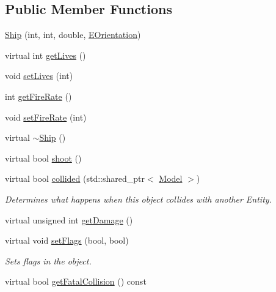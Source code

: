 \subsection*{\-Public \-Member \-Functions}
\begin{DoxyCompactItemize}
\item 
\hyperlink{classmodels_1_1Ship_a5138678b499d6d15c4b7ebef7e6d01d5}{\-Ship} (int, int, double, \hyperlink{namespacemodels_adec64ede5178a8b8fed882b3790d423d}{\-E\-Orientation})
\item 
virtual int \hyperlink{classmodels_1_1Ship_af26c5ca97e37197f48ea983a668035f6}{get\-Lives} ()
\item 
void \hyperlink{classmodels_1_1Ship_a79a5082391e2107638d45a51ce9770c2}{set\-Lives} (int)
\item 
int \hyperlink{classmodels_1_1Ship_a72f0be3703de59176bf176a7a06fcd39}{get\-Fire\-Rate} ()
\item 
void \hyperlink{classmodels_1_1Ship_aa06aba3051126d29e6e942eec54b350d}{set\-Fire\-Rate} (int)
\item 
virtual \hyperlink{classmodels_1_1Ship_aa193577f5d3e0ff3ca6e3223090d3e71}{$\sim$\-Ship} ()
\item 
virtual bool \hyperlink{classmodels_1_1Ship_afc4a82da0df7e98ba74ca068946358f5}{shoot} ()
\item 
virtual bool \hyperlink{classmodels_1_1Ship_aaa5808c580620f89bb0a04d3583a112e}{collided} (std\-::shared\-\_\-ptr$<$ \hyperlink{classmodels_1_1Model}{\-Model} $>$)
\begin{DoxyCompactList}\small\item\em \-Determines what happens when this object collides with another \-Entity. \end{DoxyCompactList}\item 
virtual unsigned int \hyperlink{classmodels_1_1Ship_acf8c86d8f95c22f990c37628ed40491e}{get\-Damage} ()
\item 
virtual void \hyperlink{classmodels_1_1Ship_a75c0e291076162e3efb9679c5896d515}{set\-Flags} (bool, bool)
\begin{DoxyCompactList}\small\item\em \-Sets flags in the object. \end{DoxyCompactList}\item 
virtual bool \hyperlink{classmodels_1_1Ship_af67b94824ab048b3623497ccbaa7fd3c}{get\-Fatal\-Collision} () const 
\end{DoxyCompactItemize}
